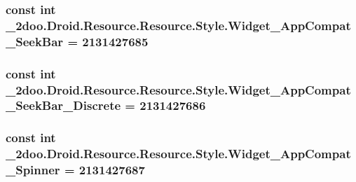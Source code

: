 \hypertarget{class__2doo_1_1_droid_1_1_resource_1_1_style_8037f93216e05f902bbb53e06ff7d410}{
\subsubsection[{Widget\_\-AppCompat\_\-SeekBar}]{\setlength{\rightskip}{0pt plus 5cm}const int \_\-2doo.Droid.Resource.Resource.Style.Widget\_\-AppCompat\_\-SeekBar = 2131427685}}
\label{class__2doo_1_1_droid_1_1_resource_1_1_style_8037f93216e05f902bbb53e06ff7d410}


\hypertarget{class__2doo_1_1_droid_1_1_resource_1_1_style_983972989bbafffc1625c6fe7b8ba821}{
\subsubsection[{Widget\_\-AppCompat\_\-SeekBar\_\-Discrete}]{\setlength{\rightskip}{0pt plus 5cm}const int \_\-2doo.Droid.Resource.Resource.Style.Widget\_\-AppCompat\_\-SeekBar\_\-Discrete = 2131427686}}
\label{class__2doo_1_1_droid_1_1_resource_1_1_style_983972989bbafffc1625c6fe7b8ba821}


\hypertarget{class__2doo_1_1_droid_1_1_resource_1_1_style_7125722a3efbfc8473a590c213bb6be4}{
\subsubsection[{Widget\_\-AppCompat\_\-Spinner}]{\setlength{\rightskip}{0pt plus 5cm}const int \_\-2doo.Droid.Resource.Resource.Style.Widget\_\-AppCompat\_\-Spinner = 2131427687}}
\label{class__2doo_1_1_droid_1_1_resource_1_1_style_7125722a3efbfc8473a590c213bb6be4}


